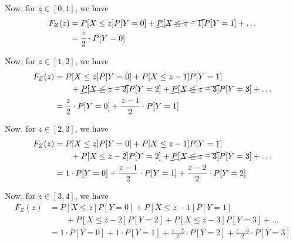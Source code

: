 Now, for \( z \in [0, 1] \), we have
\begin{align*}
    F_{Z}(z)
     & =
    P[X \leq z] P[Y = 0]
    +
    \cancel{P[X \leq z-1]} P[Y = 1]
    +
    \ldots
    \\ & =
    \frac{z}{2} \cdot P[Y = 0]
\end{align*}

Now, for \( z \in [1, 2] \), we have
\begin{align*}
    F_{Z}(z)
     & =
    P[X \leq z] P[Y = 0]
    +
    P[X \leq z-1] P[Y = 1]
    \\ & \qquad +
    \cancel{P[X \leq z-2]} P[Y = 2]
    +
    \cancel{P[X \leq z-3]} P[Y = 3]
    +
    \ldots
    \\ & =
    \frac{z}{2} \cdot P[Y = 0]
    +
    \frac{z-1}{2} \cdot P[Y = 1]
\end{align*}

Now, for \( z \in [2, 3] \), we have
\begin{align*}
    F_{Z}(z)
     & =
    P[X \leq z] P[Y = 0]
    +
    P[X \leq z-1] P[Y = 1]
    \\ & \qquad +
    P[X \leq z-2] P[Y = 2]
    +
    \cancel{P[X \leq z-3]} P[Y = 3]
    +
    \ldots
    \\ & =
    1 \cdot P[Y = 0]
    +
    \frac{z-1}{2} \cdot P[Y = 1]
    +
    \frac{z-2}{2} \cdot P[Y = 2]
\end{align*}

Now, for \( z \in [3, 4] \), we have
\begin{align*}
    F_{Z}(z)
     & =
    P[X \leq z] P[Y = 0]
    +
    P[X \leq z-1] P[Y = 1]
    \\ & \qquad +
    P[X \leq z-2] P[Y = 2]
    +
    P[X \leq z-3] P[Y = 3]
    +
    \ldots
    \\ & =
    1 \cdot P[Y = 0]
    +
    1 \cdot P[Y = 1]
    +
    \frac{z-2}{2} \cdot P[Y = 2]
    +
    \frac{z-3}{2} \cdot P[Y = 3]
\end{align*}
